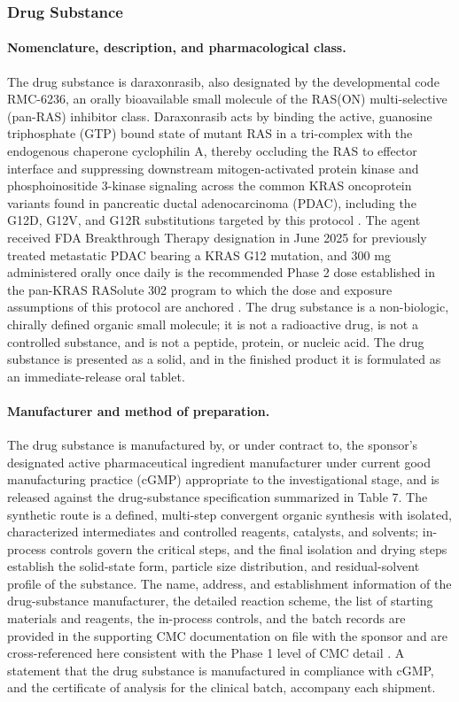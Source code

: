 \subsubsection{Drug Substance}

\paragraph{Nomenclature, description, and pharmacological class.}
The drug substance is daraxonrasib, also designated by the developmental code
RMC-6236, an orally bioavailable small molecule of the RAS(ON)
multi-selective (pan-RAS) inhibitor class. Daraxonrasib acts by binding the
active, guanosine triphosphate (GTP) bound state of mutant RAS in a tri-complex
with the endogenous chaperone cyclophilin A, thereby occluding the
RAS to effector interface and suppressing downstream mitogen-activated protein
kinase and phosphoinositide 3-kinase signaling across the common KRAS
oncoprotein variants found in pancreatic ductal adenocarcinoma (PDAC), including
the G12D, G12V, and G12R substitutions targeted by this protocol
\cite{daraxwhipple,pdac060s2030}. The agent received FDA Breakthrough Therapy
designation in June 2025 for previously treated metastatic PDAC bearing a KRAS
G12 mutation, and 300 mg administered orally once daily is the recommended
Phase 2 dose established in the pan-KRAS RASolute 302 program to which the dose
and exposure assumptions of this protocol are anchored
\cite{daraxwhipple,pdac060s2030}. The drug substance is a non-biologic, chirally
defined organic small molecule; it is not a radioactive drug, is not a
controlled substance, and is not a peptide, protein, or nucleic acid. The drug
substance is presented as a solid, and in the finished product it is formulated
as an immediate-release oral tablet.

\paragraph{Manufacturer and method of preparation.}
The drug substance is manufactured by, or under contract to, the sponsor's
designated active pharmaceutical ingredient manufacturer under current good
manufacturing practice (cGMP) appropriate to the investigational stage, and is
released against the drug-substance specification summarized in Table 7. The
synthetic route is a defined, multi-step convergent organic synthesis with
isolated, characterized intermediates and controlled reagents, catalysts, and
solvents; in-process controls govern the critical steps, and the final isolation
and drying steps establish the solid-state form, particle size distribution, and
residual-solvent profile of the substance. The name, address, and
establishment information of the drug-substance manufacturer, the detailed
reaction scheme, the list of starting materials and reagents, the in-process
controls, and the batch records are provided in the supporting CMC documentation
on file with the sponsor and are cross-referenced here consistent with the
Phase 1 level of CMC detail \cite{phase1guidance}. A statement that the drug
substance is manufactured in compliance with cGMP, and the certificate of
analysis for the clinical batch, accompany each shipment.

